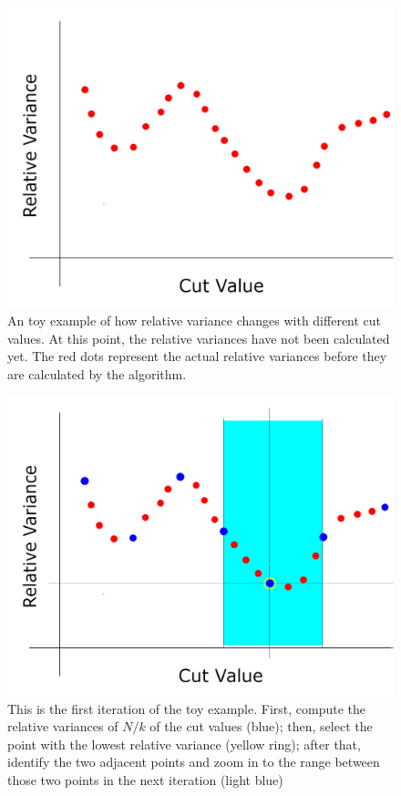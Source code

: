 \begin{figure}[htbp]
	\centering
	\includegraphics[height=0.25 \textheight]{"fig/cbla/divide-and-zoom-in_1"}
	\caption[Illustration explaining the "Divid-and-Zoom-In" region split values computation method 1]{An toy example of how relative variance changes with different cut values. At this point, the relative variances have not been calculated yet. The red dots represent the actual relative variances before they are calculated by the algorithm.}
	\label{fig:divide-and-zoom-in_1}
\end{figure}	
\begin{figure}[htbp]
	\centering
	\includegraphics[height=0.3 \textheight]{"fig/cbla/divide-and-zoom-in_2"}
	\caption[Illustration explaining the "Divid-and-Zoom-In" region split values computation method 2]{This is the first iteration of the toy example. First, compute the relative variances of $N/k$ of the cut values (blue); then, select the point with the lowest relative variance (yellow ring); after that, identify the two adjacent points and zoom in to the range between those two points in the next iteration (light blue)}
	\label{fig:divide-and-zoom-in_2}
\end{figure}	
